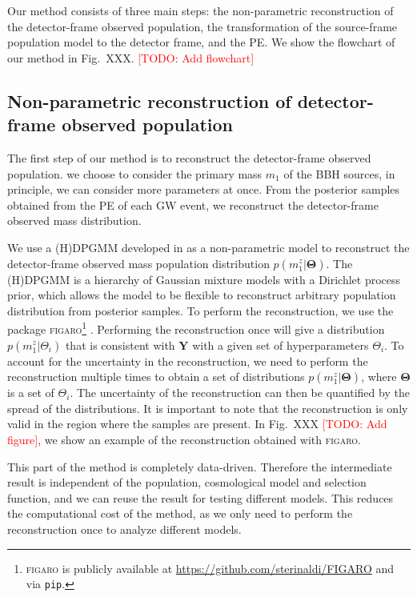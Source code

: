 \documentclass[aps,prd,twocolumn,superscriptaddress,preprintnumbers,nofootinbib,hidelinks]{revtex4-2}
\newcommand{\todo}[1]{\textcolor{red}{[TODO: #1]}}
\begin{document}
Our method consists of three main steps: the non-parametric reconstruction of the detector-frame observed population, the transformation of the source-frame population model to the detector frame, and the \ac{PE}.
We show the flowchart of our method in Fig.~XXX. \todo{Add flowchart}

\subsection{Non-parametric reconstruction of detector-frame observed population}
\label{sec:reconstruction}

The first step of our method is to reconstruct the detector-frame observed population.
we choose to consider the primary mass $m_1$ of the \ac{BBH} sources, in principle, we can consider more parameters at once.
From the posterior samples obtained from the \ac{PE} of each \ac{GW} event, we reconstruct the detector-frame observed mass distribution.

We use a \ac{(H)DPGMM} developed in \citet{Rinaldi:2021bhm} as a non-parametric model to reconstruct the detector-frame observed mass population distribution $p(m^z_1|\mathbf{\Theta})$.
The \ac{(H)DPGMM} is a hierarchy of Gaussian mixture models with a Dirichlet process prior, which allows the model to be flexible to reconstruct arbitrary population distribution from posterior samples.
To perform the reconstruction, we use the package \textsc{figaro}\footnote{\textsc{figaro} is publicly available at \url{https://github.com/sterinaldi/FIGARO} and via \texttt{pip}.} \citep{Rinaldi:2024eep}.
Performing the reconstruction once will give a distribution $p(m^z_1|\Theta_i)$ that is consistent with $\mathbf{Y}$ with a given set of hyperparameters $\Theta_i$.
To account for the uncertainty in the reconstruction, we need to perform the reconstruction multiple times to obtain a set of distributions $p(m^z_1|\mathbf{\Theta})$, where $\mathbf{\Theta}$ is a set of $\Theta_i$.
The uncertainty of the reconstruction can then be quantified by the spread of the distributions.
It is important to note that the reconstruction is only valid in the region where the samples are present.
In Fig.~XXX \todo{Add figure}, we show an example of the reconstruction obtained with \textsc{figaro}.

This part of the method is completely data-driven.
Therefore the intermediate result is independent of the population, cosmological model and selection function, and we can reuse the result for testing different models.
This reduces the computational cost of the method, as we only need to perform the reconstruction once to analyze different models.
\end{document}

